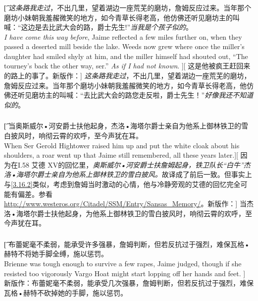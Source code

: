 \documentclass[12pt,a4paper]{article}
\begin{document}
\subsubsection{}\t[
	\emph{这条路我走过}，不出几里，望着湖边一座荒芜的磨坊，詹姆反应过来。当年那个磨坊小妹朝我羞赧微笑的地方，如今青草长得老高，他仿佛还听见磨坊主的叫喊：“这边是去比武大会的路，爵士先生!”\emph{当我是个孩子似的}。\\
	\emph{I have come this way before}, Jaime reflected a few miles further on, when they passed a deserted mill beside the lake. Weeds now grew where once the miller's daughter had smiled shyly at him, and the miller himself had shouted out, “The tourney's back the other way, ser.” \emph{As if I had not known}. ][
	这是他被疯王赶回来的路上的事了。新版作：]
	\emph{这条路我走过}，不出几里，望着湖边一座荒芜的磨坊，詹姆反应过来。当年那个磨坊小妹朝我羞赧微笑的地方，如今青草长得老高，他仿佛还听见磨坊主的叫喊：“去比武大会的路您走反啦，爵士先生！”\emph{好像我还不知道似的}。
	
\subsubsection{}\t[	
	当奥斯威尔•河安爵士扶他起身，杰洛•海塔尔爵士亲自为他系上御林铁卫的雪白披风时，响彻云霄的欢呼，至今声犹在耳。\\
	When Ser Gerold Hightower raised him up and put the white cloak about his shoulders, a roar went up that Jaime still remembered, all these years later.][
	因为在I.58 艾德 XV的回忆里，\emph{奥斯威尔•河安爵士扶詹姆起身，铁卫队长“白牛”杰洛•海塔尔爵士亲自为他系上御林铁卫的雪白披风。}故译成了前后一致。但事实上与\ref{3.16.2}类似，考虑到詹姆当时激动的心情，他与冷静旁观的艾德的回忆完全可能有偏差。参看\url{http://www.westeros.org/Citadel/SSM/Entry/Sansas_Memory/}。新版作：]
	当杰洛•海塔尔爵士扶他起身，为他系上御林铁卫的雪白披风时，响彻云霄的欢呼，至今声犹在耳。
	
\subsubsection{}\t[
	布蕾妮毫不柔弱，能承受许多强暴，詹姆判断，但若反抗过于强烈，难保瓦格•赫特不将她手脚全缚，施以惩罚。\\
	Brienne was tough enough to survive a few rapes, Jaime judged, though if she resisted too vigorously Vargo Hoat might start lopping off her hands and feet. ]
	新版作：布蕾妮毫不柔弱，能承受几次强暴，詹姆判断，但若反抗过于强烈，难保瓦格•赫特不砍掉她的手脚，施以惩罚。
	
\end{document}
